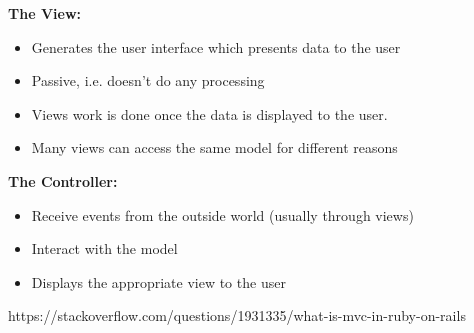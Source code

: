 \textbf{The View:}
\vspace{-5mm}
\begin{itemize}
 \setlength{\itemsep}{-5pt}
\item Generates the user interface which presents data to the user
\item Passive, i.e. doesn’t do any processing
\item Views work is done once the data is displayed to the user.
\item Many views can access the same model for different reasons
\end{itemize}

\textbf{The Controller:}
\vspace{-5mm}
\begin{itemize}
 \setlength{\itemsep}{-5pt}
\item Receive events from the outside world (usually through views)
\item Interact with the model
\item Displays the appropriate view to the user
\end{itemize}

https://stackoverflow.com/questions/1931335/what-is-mvc-in-ruby-on-rails




